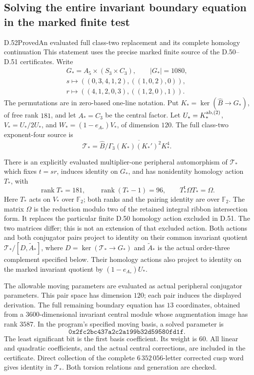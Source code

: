 \subsection{Solving the entire invariant boundary equation in the marked finite test}

\begin{statement}{D.52}{Proved}{An evaluated full class-two replacement and its complete homology continuation}
This statement uses the precise marked finite source
of the D.50--D.51 certificates. Write
\[
 \begin{gathered}
 G_* = A_5\times(S_3\times C_3),\qquad |G_*|=1080,\\
 s\longmapsto
  ((0,3,4,1,2),((1,0,2),0)),\\
 r\longmapsto
  ((4,1,2,0,3),((1,2,0),1)).
 \end{gathered}
 \tag{D.52.1}
\]
The permutations are in zero-based one-line notation.
Put \(K_*=\ker(\widehat B\to G_*)\), of free rank \(181\),
and let \(A_*=C_3\) be the central factor.
Let \(U_*=K_*^{\rm ab,(2)}\), \(V_*=U_*/2U_*\),
and \(W_*=(1-e_{A_*})V_*\), of dimension \(120\).
The full class-two exponent-four source is
\[
 \mathcal T_*=
 \widehat B/
 \overline{\Gamma_3(K_*)(K_*')^2K_*^4}.
 \tag{D.52.2}
\]

There is an explicitly evaluated multiplier-one
peripheral automorphism of \(\mathcal T_*\)
which fixes \(t=sr\), induces identity on \(G_*\),
and has nonidentity homology action \(T_*\), with
\[
          \operatorname{rank}T_*=181,\qquad
          \operatorname{rank}(T_*-1)=96,\qquad
          T_*^{\mathsf t}\Omega T_*=\Omega .
 \tag{D.52.3}
\]
Here \(T_*\) acts on \(V_*\) over \(\mathbb F_2\);
both ranks and the pairing identity are over \(\mathbb F_2\).
The matrix \(\Omega\) is the reduction modulo two of
the retained integral ribbon intersection form.
It replaces the particular finite D.50 homology
action excluded in D.51. The two matrices differ;
this is not an extension of that excluded action.
Both actions and both conjugator pairs project
to identity on their common invariant quotient
\(\mathcal T_*/[D,\widetilde A_*]\), where
\(D=\ker(\mathcal T_*\to G_*)\) and
\(\widetilde A_*\) is the actual order-three
complement specified below.
Their homology actions also project to identity
on the marked invariant quotient by
\((1-e_{A_*})U_*\).

The allowable moving parameters are evaluated
as actual peripheral conjugator parameters.
This pair space has dimension \(120\); each pair
induces the displayed derivation. The full remaining
boundary equation has \(13\) coordinates,
obtained from a \(3600\)-dimensional invariant
central module whose augmentation image has
rank \(3587\). In the program's specified
moving basis, a solved parameter is
\[
     \mathtt{0x2fc2bc437a2c2a199b32d59580fd1f}.
 \tag{D.52.4}
\]
The least significant bit is the first basis
coefficient. Its weight is \(60\). All linear
and quadratic coefficients, and the actual
central corrections, are included in the
certificate. Direct collection of the complete
\(6\,352\,056\)-letter corrected cusp word
gives identity in \(\mathcal T_*\).
Both torsion relations and generation are checked.


\end{statement}
